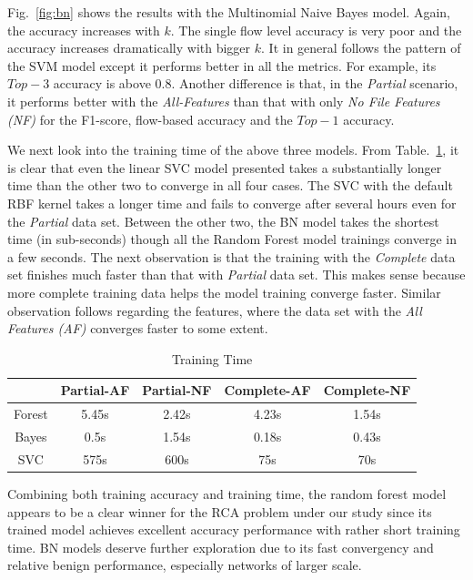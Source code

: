 Fig.~\ref{fig:bn} shows the results with the Multinomial Naive Bayes model. Again, the accuracy increases with $k$. The single flow level accuracy is very poor and the accuracy increases dramatically with bigger $k$. 
It in general follows the pattern of the SVM model except it performs better in all the metrics. For example, its $Top-3$ accuracy is above $0.8$. Another difference is that, in the {\it Partial} scenario, it performs better with the {\it All-Features} than that with only {\it No File Features (NF) } for the F1-score, flow-based accuracy and the $Top-1$ accuracy.

We next look into the training time of the above three models. From Table.~\ref{tab:time}, it is clear that even the linear SVC model presented takes a substantially longer time than the other two to converge in all four cases. The SVC with the default RBF kernel takes a longer time and fails to converge after several hours even for the {\it Partial} data set. Between the other two, the BN model takes the shortest time (in sub-seconds) though all the Random Forest model trainings converge in a few seconds. The next observation is that the training with the {\it Complete} data set finishes much faster than that with {\it Partial} data set. This makes sense because more complete training data helps the model training converge faster. Similar observation follows regarding the features, where the data set with the {\it All Features (AF)} converges faster to some extent.

\begin{table}[!ht]
\caption{Training Time }
\label{tab:time}
\begin{center}
\begin{tabular}{ |c|c|c|c|c| } 
 \hline
  & Partial-AF & Partial-NF & Complete-AF & Complete-NF\\ 
 \hline
 Forest & 5.45s & 2.42s & 4.23s & 1.54s\\ 
 \hline
 Bayes & 0.5s & 1.54s & 0.18s & 0.43s\\
 \hline
 SVC & 575s & 600s & 75s &70s\\ 
 \hline
\end{tabular}
\end{center}
\end{table}
Combining both training accuracy and training time, the random forest model appears to be a clear winner for the RCA problem under our study since its trained model achieves excellent accuracy performance with rather short training time. BN models deserve further exploration due to its fast convergency and relative benign performance, especially networks of larger scale.

